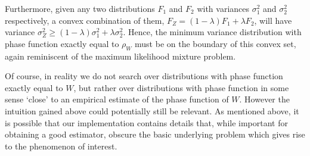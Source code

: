 Furthermore, given any two distributions $F_1$ and $F_2$ with variances $\sigma_1^2$ and $\sigma_2^2$ respectively, a convex combination of them, $F_Z = (1 - \lambda)F_1 + \lambda F_2$, will have variance $\sigma_Z^2 \geq (1 - \lambda) \sigma_1^2 + \lambda \sigma_2^2$. Hence, the minimum variance distribution with phase function exactly equal to $\rho_W$ must be on the boundary of this convex set, again reminiscent of the maximum likelihood mixture problem.





Of course, in reality we do not search over distributions with phase function exactly equal to $W$, but rather over distributions with phase function in some sense `close' to an empirical estimate of the phase function of $W$. However the intuition gained above could potentially still be relevant. As mentioned above, it is possible that our implementation contains details that, while important for obtaining a good estimator, obscure the basic underlying problem which gives rise to the phenomenon of interest.






